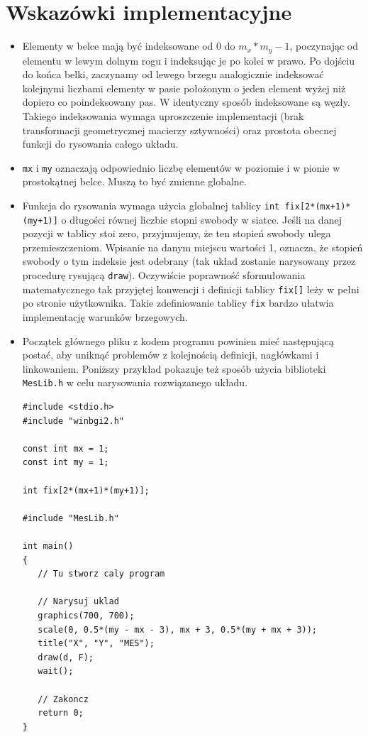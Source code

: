 \documentclass{instrukcja}
\begin{document}
\section{Wskazówki implementacyjne}
\begin{itemize}
\item Elementy w belce mają być indeksowane od 0 do $m_x*m_y-1$, poczynając od elementu w lewym dolnym rogu i indeksując je po kolei w prawo. Po dojściu do końca belki, zaczynamy od lewego brzegu analogicznie indeksować kolejnymi liczbami elementy w pasie położonym o jeden element wyżej niż dopiero co poindeksowany pas. W identyczny sposób indeksowane są węzły. Takiego indeksowania wymaga uproszczenie implementacji (brak transformacji geometrycznej macierzy sztywności) oraz prostota obecnej funkcji do rysowania całego układu.
\item {\tt mx} i {\tt my} oznaczają odpowiednio liczbę elementów w poziomie i w pionie w prostokątnej belce. Muszą to być zmienne globalne.
\item Funkcja do rysowania wymaga użycia globalnej tablicy {\tt int fix[2*(mx+1)*(my+1)]} o długości równej liczbie stopni swobody w siatce. Jeśli na danej pozycji w tablicy stoi zero, przyjmujemy, że ten stopień swobody ulega przemieszczeniom. Wpisanie na danym miejscu wartości 1, oznacza, że stopień swobody o tym indeksie jest odebrany (tak układ zostanie narysowany przez procedurę rysującą {\tt draw}). Oczywiście poprawność sformułowania matematycznego tak przyjętej konwencji i definicji tablicy {\tt fix[]} leży w pełni po stronie użytkownika. Takie zdefiniowanie tablicy {\tt fix} bardzo ułatwia implementację warunków brzegowych.
\item Początek głównego pliku z kodem programu powinien mieć następującą postać, aby uniknąć problemów z kolejnością definicji, nagłówkami i linkowaniem. Poniższy przykład pokazuje też sposób użycia biblioteki {\tt MesLib.h} w celu narysowania rozwiązanego układu.
\begin{verbatim}
#include <stdio.h>
#include "winbgi2.h"

const int mx = 1;
const int my = 1;

int fix[2*(mx+1)*(my+1)];

#include "MesLib.h"

int main()
{
   // Tu stworz caly program

   // Narysuj uklad
   graphics(700, 700);
   scale(0, 0.5*(my - mx - 3), mx + 3, 0.5*(my + mx + 3));
   title("X", "Y", "MES");
   draw(d, F);
   wait();
   
   // Zakoncz
   return 0;
}
\end{verbatim}
\end{itemize}
\end{document}
